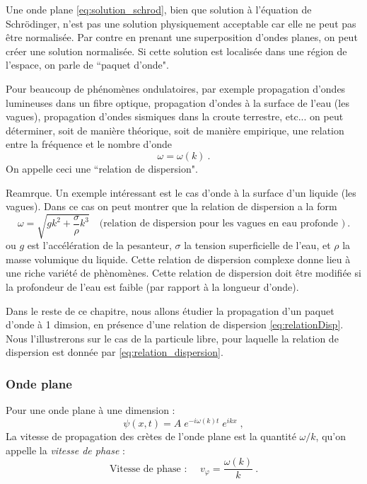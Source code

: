 \documentclass{book}
\begin{document}
Une onde plane \eqref{eq:solution_schrod}, bien que solution à l'équation de Schrödinger, n'est pas une solution physiquement acceptable car elle ne peut pas être normalisée. Par contre en prenant une superposition d'ondes planes, on peut créer une solution normalisée. Si cette solution est localisée dans une région de l'espace, on parle de ``paquet d'onde".

Pour beaucoup de phénomènes ondulatoires, par exemple propagation d'ondes lumineuses dans un fibre optique, propagation d'ondes à la surface de l'eau (les vagues), propagation d'ondes sismiques dans la croute terrestre, etc... on peut déterminer, soit de manière théorique, soit de manière empirique, une relation entre la fréquence et le nombre d'onde
\begin{equation}
\omega = \omega(k)\ . \label{eq:relationDisp}
\end{equation}
On appelle ceci une ``relation de dispersion".

Reamrque. Un exemple intéressant est le cas d'onde à la surface d'un liquide (les vagues). Dans ce cas on peut montrer que la relation de dispersion a la form
\begin{equation}
\omega = \sqrt { g k^2 + \frac{\sigma}{\rho}k^3}
\quad \text{(relation de dispersion pour les vagues en eau profonde )}
\ . \label{eq:relationDisp-vagues}
\end{equation}
ou $g$ est l'accélération de la pesanteur, $\sigma$ la tension superficielle de l'eau, et $\rho$ la masse volumique du liquide. Cette relation de dispersion complexe donne lieu à une riche variété de phènomènes. Cette relation de dispersion doit être modifiée si la profondeur de l'eau est faible (par rapport à la longueur d'onde).

Dans le reste de ce chapitre, nous allons étudier la propagation d'un paquet d'onde à 1 dimsion, en présence d'une relation de dispersion \eqref{eq:relationDisp}.
Nous l'illustrerons sur le cas de la particule libre, pour laquelle la relation de dispersion est donnée par \eqref{eq:relation_dispersion}.



\subsubsection{Onde plane}
Pour une onde plane à une dimension :
$$\psi(x,t) = A \; e^{-i\omega(k) t} \; e ^{ikx} \; ,$$
La vitesse de propagation des crètes de l'onde plane est la quantité $\omega/k$, qu'on appelle la \textit{vitesse de phase} :
\begin{equation}
\boxed{
\text{Vitesse de phase : } \quad v_\varphi = \dfrac{\omega(k)}{k} \ .
}
\label{eq:vphase}
\end{equation}
\end{document}
